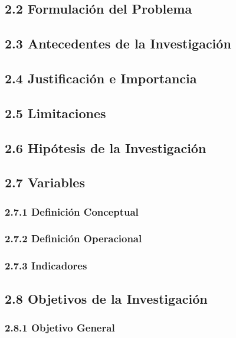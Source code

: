 \documentclass[12pt]{../componentes/uns}
\begin{document}
\subsection*{2.2 Formulación del Problema}
\lipsum[3]

\subsection*{2.3 Antecedentes de la Investigación}
\lipsum[4]

\subsection*{2.4 Justificación e Importancia}
\lipsum[5]

\subsection*{2.5 Limitaciones}
\lipsum[6]

\subsection*{2.6 Hipótesis de la Investigación}
\lipsum[7]

\subsection*{2.7 Variables}
\subsubsection*{2.7.1 Definición Conceptual}
\lipsum[8]

\subsubsection*{2.7.2 Definición Operacional}
\lipsum[9]

\subsubsection*{2.7.3 Indicadores}
\lipsum[10]

\subsection*{2.8 Objetivos de la Investigación}
\subsubsection*{2.8.1 Objetivo General}
\lipsum[11]
\end{document}
